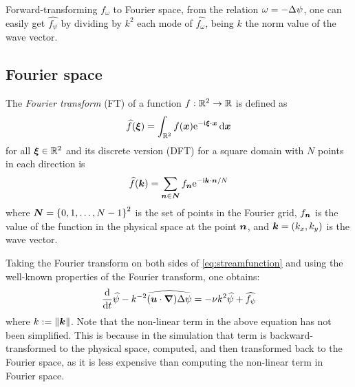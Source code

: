 \documentclass[../main.tex]{subfiles}
\begin{document}
Forward-transforming $f_\omega$ to Fourier space, from the relation $\omega = -\Delta \psi$, one can easily get $\widehat{f_\psi}$ by dividing by $k^2$ each mode of $\widehat{f_\omega}$, being $k$ the norm value of the wave vector.

\subsection{Fourier space}
The \emph{Fourier transform} (FT) of a function $f:\mathbb{R}^2 \to \mathbb{R}$ is defined as
\begin{equation}
	\widehat{f}(\boldsymbol{\xi}) = \int_{\mathbb{R}^2} f(\boldsymbol{x}) \mathrm{e}^{-\mathrm{i} \boldsymbol{\xi} \cdot \boldsymbol{x}} \dd{\boldsymbol{x}}
\end{equation}
for all $\boldsymbol{\xi}\in\mathbb{R}^2$ and its discrete version (DFT) for a square domain with $N$ points in each direction is
\begin{equation}
	\widehat{f}(\boldsymbol{k}) = \sum_{\boldsymbol{n}\in\boldsymbol{N}} f_{\boldsymbol{n}} \mathrm{e}^{-\mathrm{i} \boldsymbol{k} \cdot \boldsymbol{n} / N}
\end{equation}
where $\boldsymbol{N} = {\{0,1,\ldots,N-1\}}^2$ is the set of points in the Fourier grid, $f_{\boldsymbol{n}}$ is the value of the function in the physical space at the point $\boldsymbol{n}$, and $\boldsymbol{k} = (k_x,k_y)$ is the wave vector.

Taking the Fourier transform on both sides of \cref{eq:streamfunction} and using the well-known properties of the Fourier transform, one obtains:
\begin{equation}\label{eq:streamfunction_fourier}
	\dv{}{t}\widehat{\psi} - k^{-2} \widehat{(\boldsymbol{u}\cdot \grad) \Delta \psi}= -\nu k^2 \widehat{\psi} + \widehat{f_\psi}
\end{equation}
where $k:=\left\|\boldsymbol{k}\right\|$. Note that the non-linear term in the above equation has not been simplified. This is because in the simulation that term is backward-transformed to the physical space, computed, and then transformed back to the Fourier space, as it is less expensive than computing the non-linear term in Fourier space.
\end{document}
